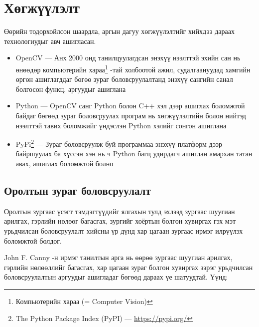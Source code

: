 
\chapter{Хөгжүүлэлт}

Өөрийн тодорхойлсон шаардла, аргын дагуу хөгжүүлэлтийг хийхдээ дараах технологиудыг авч ашигласан.

\begin{itemize}
	\item OpenCV \cite{opencv} --- Анх 2000 онд танилцуулагдсан энэхүү нээлттэй эхийн сан нь өнөөдөр компьютерийн хараа\footnote{ Компьютерийн хараа (= Computer Vision)} -тай холбоотой ажил, судалгаануудад хамгийн өргөн ашиглагддаг бөгөө зураг боловсруулалтанд энэхүү сангийн санал болгосон функц, аргуудыг ашиглана
	\item Python \cite{python} --- OpenCV санг Python болон C++ хэл дээр ашиглах боломжтой байдаг бөгөөд зураг боловсруулах програм нь хөгжүүлэлтийн болон нийтэд нээлттэй тавих боломжийг үндэслэн Python хэлийг сонгон ашиглана
	\item PyPi\footnote{The Python Package Index (PyPI) --- \url{https://pypi.org/}} --- Зураг боловсруулж буй программаа энэхүү платформ дээр байршуулах ба хүссэн хэн нь ч Python багц удирдагч ашиглан амархан татан авах, ашиглах боломжтой болно
\end{itemize}

\section{Оролтын зураг боловсруулалт}

Оролтын зургаас үсэгт тэмдэгтүүдийг ялгахын тулд эхлээд зургаас шуугиан арилгах, гэрлийн нөлөөг багасгах, зургийг хоёртын болгон хувиргах гэх мэт урьдчилсан боловсруулалт хийсны үр дүнд хар цагаан зургаас ирмэг илрүүлэх боломжтой болдог.

John F. Canny -н ирмэг танилтын арга нь өөрөө зургаас шуугиан арилгах, гэрлийн нөлөөллийг багасгах, хар цагаан зураг болгон хувиргах зэрэг урьдчилсан боловсруулалтын аргуудыг ашигладаг бөгөөд дараах үе шатуудтай. Үүнд:

